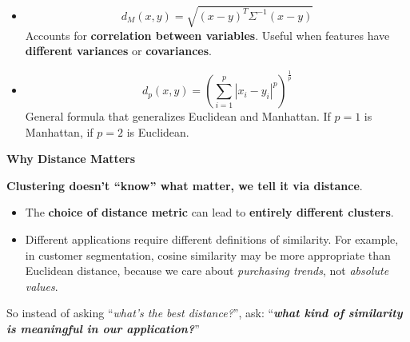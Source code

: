 \begin{itemize}
    \item {}
    \begin{equation}
        d_{M}\left(x,y\right) = \sqrt{\left(x-y\right)^{T} \Sigma^{-1} \left(x - y\right)}
    \end{equation}
    Accounts for \textbf{correlation between variables}. Useful when features have \textbf{different variances} or \textbf{covariances}.


    \item {}
    \begin{equation}
        d_{p}\left(x, y\right) = \left(\displaystyle\sum_{i=1}^{p} \left|x_{i} - y_{i}\right|^{p}\right)^{\frac{1}{p}}
    \end{equation}
    General formula that generalizes Euclidean and Manhattan. If $p=1$ is Manhattan, if $p=2$ is Euclidean.
\end{itemize}

\highspace
\begin{flushleft}
    \textcolor{Green3}{ \textbf{Why Distance Matters}}
\end{flushleft}
\textbf{Clustering doesn't ``know'' what matter, we tell it via distance}.
\begin{itemize}
    \item The \textbf{choice of distance metric} can lead to \textbf{entirely different clusters}.
    \item Different applications require different definitions of similarity. For example, in customer segmentation, cosine similarity may be more appropriate than Euclidean distance, because we care about \emph{purchasing trends}, not \emph{absolute values}.
\end{itemize}
So instead of asking ``\emph{what's the best distance?}'', ask: ``\textbf{\emph{what kind of similarity is meaningful in our application?}}''